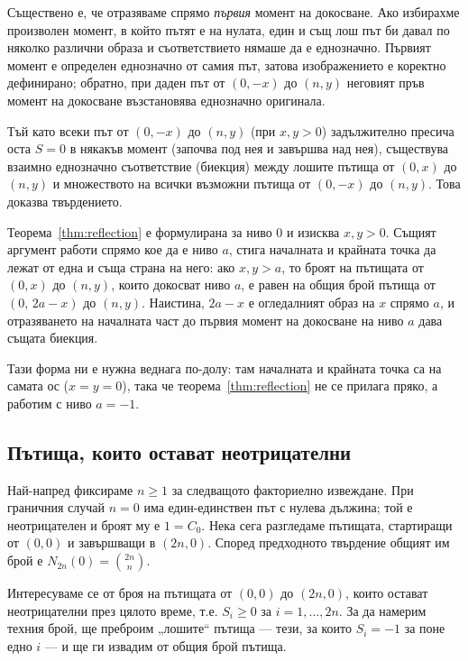 Съществено е, че отразяваме спрямо \emph{първия} момент на докосване. Ако избирахме
произволен момент, в който пътят е на нулата, един и същ лош път би давал по няколко
различни образа и съответствието нямаше да е еднозначно. Първият момент е определен
еднозначно от самия път, затова изображението е коректно дефинирано; обратно, при даден
път от $(0,-x)$ до $(n,y)$ неговият пръв момент на докосване възстановява еднозначно
оригинала.

Тъй като всеки път от $(0,-x)$ до $(n,y)$ (при $x,y > 0$) задължително пресича оста $S=0$ в някакъв момент (започва под нея и завършва над нея), съществува взаимно еднозначно съответствие (биекция) между лошите пътища от $(0,x)$ до $(n,y)$ и множеството на всички възможни пътища от $(0,-x)$ до $(n,y)$. Това доказва твърдението.

\begin{supp}\label{supp:reflection-level}
Теорема~\ref{thm:reflection} е формулирана за ниво $0$ и изисква $x, y > 0$. Същият
аргумент работи спрямо кое да е ниво $a$, стига началната и крайната точка да лежат от
една и съща страна на него: ако $x, y > a$, то броят на пътищата от $(0,x)$ до $(n,y)$,
които докосват ниво $a$, е равен на общия брой пътища от $(0,\, 2a - x)$ до $(n,y)$.
Наистина, $2a-x$ е огледалният образ на $x$ спрямо $a$, и отразяването на началната част
до първия момент на докосване на ниво $a$ дава същата биекция.

Тази форма ни е нужна веднага по-долу: там началната и крайната точка са на самата ос
($x = y = 0$), така че теорема~\ref{thm:reflection} не се прилага пряко, а работим с
ниво $a = -1$.
\end{supp}

\subsection{Пътища, които остават неотрицателни}
Най-напред фиксираме $n\ge1$ за следващото факториелно извеждане. При граничния случай $n=0$ има един-единствен път с нулева дължина; той е неотрицателен и броят му е $1=C_0$.
Нека сега разгледаме пътищата, стартиращи от $(0,0)$ и завършващи в $(2n, 0)$. Според предходното твърдение общият им брой е $N_{2n}(0) = \binom{2n}{n}$.

Интересуваме се от броя на пътищата от $(0,0)$ до $(2n, 0)$, които остават неотрицателни през цялото време, т.е. $S_i \geq 0$ за $i=1, \dots, 2n$.
За да намерим техния брой, ще преброим „лошите“ пътища — тези, за които $S_i = -1$ за поне едно $i$ — и ще ги извадим от общия брой пътища.


